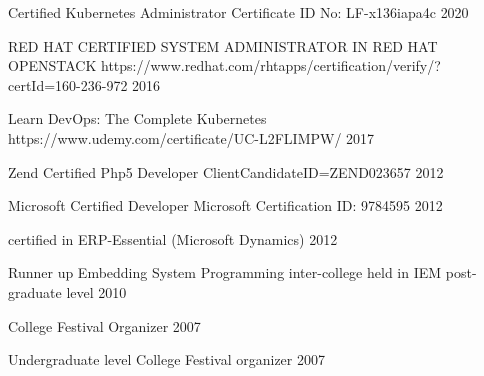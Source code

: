 

\cvsubsection{}


\begin{cvhonors}

  \cvhonor
    {Certified Kubernetes Administrator} %
    {Certificate ID No: LF-x136iapa4c} %
    {} %
    {2020} %

  \cvhonor
    {RED HAT CERTIFIED SYSTEM ADMINISTRATOR IN RED HAT OPENSTACK} %
    {https://www.redhat.com/rhtapps/certification/verify/?certId=160-236-972} %
    {} %
    {2016} %

  \cvhonor
    {Learn DevOps: The Complete Kubernetes} %
    {https://www.udemy.com/certificate/UC-L2FLIMPW/} %
    {} %
    {2017} %

  \cvhonor
    {Zend Certified Php5 Developer} %
    {ClientCandidateID=ZEND023657} %
    {} %
    {2012} %

  \cvhonor
    {Microsoft Certified Developer} %
    {Microsoft Certification ID:  9784595} %
    {} %
    {2012} %

  \cvhonor
    {certified in ERP-Essential (Microsoft Dynamics)} %
    {} %
    {} %
    {2012} %

  \cvhonor
    {Runner up Embedding System Programming inter-college held in IEM post-graduate level} %
    {} %
    {} %
    {2010} %

  \cvhonor
    {College Festival Organizer} %
    {} %
    {} %
    {2007} %

  \cvhonor
    {Undergraduate level College Festival organizer} %
    {} %
    {} %
    {2007} %



\end{cvhonors}

